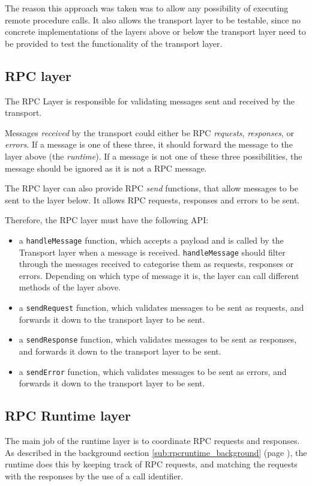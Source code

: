 The reason this approach was taken was to allow any possibility of executing remote procedure calls. It also allows the transport layer to be testable, since no concrete implementations of the layers above or below the transport layer need to be provided to test the functionality of the transport layer.

\subsection{RPC layer} %
\label{sub:json_rpc_layer_design}
The RPC Layer is responsible for validating messages sent and received by the transport. 

Messages \emph{received} by the transport could either be RPC \emph{requests}, \emph{responses}, or \emph{errors}. If a message is one of these three, it should forward the message to the layer above (the \emph{runtime}). If a message is not one of these three possibilities, the message should be ignored as it is not a RPC message.

The RPC layer can also provide RPC \emph{send} functions, that allow messages to be sent to the layer below. It allows RPC requests, responses and errors to be sent.

Therefore, the RPC layer must have the following API:
\begin{itemize}
	\item a \lstinline+handleMessage+ function, which accepts a payload and is called by the Transport layer when a message is received. \lstinline+handleMessage+ should filter through the messages received to categorise them as requests, responses or errors. Depending on which type of message it is, the layer can call different methods of the layer above.
	\item a \lstinline+sendRequest+ function, which validates messages to be sent as requests, and forwards it down to the transport layer to be sent.
	\item a \lstinline+sendResponse+ function, which validates messages to be sent as responses, and forwards it down to the transport layer to be sent.
	\item a \lstinline+sendError+ function, which validates messages to be sent as errors, and forwards it down to the transport layer to be sent.
\end{itemize}



\subsection{RPC Runtime layer} %
\label{sub:rpc_runtime_layer_design}
The main job of the runtime layer is to coordinate RPC requests and responses. As described in the background section \ref{sub:rpcruntime_background} (page \pageref{sub:rpcruntime_background}), the runtime does this by keeping track of RPC requests, and matching the requests with the responses by the use of a call identifier.

